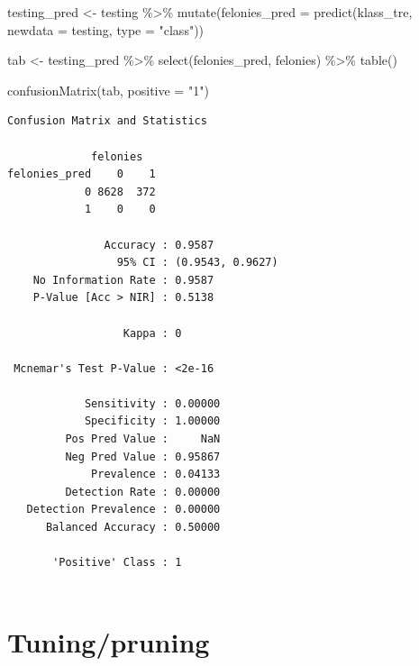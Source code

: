 \documentclass[
  letterpaper,
  DIV=11,
  numbers=noendperiod]{scrreprt}
\newenvironment{Shaded}{\begin{snugshade}}{\end{snugshade}}
\newcommand{\AttributeTok}[1]{\textcolor[rgb]{0.40,0.45,0.13}{#1}}
\newcommand{\FunctionTok}[1]{\textcolor[rgb]{0.28,0.35,0.67}{#1}}
\newcommand{\NormalTok}[1]{\textcolor[rgb]{0.00,0.23,0.31}{#1}}
\newcommand{\OtherTok}[1]{\textcolor[rgb]{0.00,0.23,0.31}{#1}}
\newcommand{\SpecialCharTok}[1]{\textcolor[rgb]{0.37,0.37,0.37}{#1}}
\newcommand{\StringTok}[1]{\textcolor[rgb]{0.13,0.47,0.30}{#1}}
\begin{document}
\begin{Shaded}
\begin{Highlighting}[]
\NormalTok{testing\_pred }\OtherTok{\textless{}{-}}\NormalTok{ testing }\SpecialCharTok{\%\textgreater{}\%}
  \FunctionTok{mutate}\NormalTok{(}\AttributeTok{felonies\_pred =} \FunctionTok{predict}\NormalTok{(klass\_tre, }\AttributeTok{newdata =}\NormalTok{ testing, }\AttributeTok{type =} \StringTok{"class"}\NormalTok{))}

\NormalTok{tab }\OtherTok{\textless{}{-}}\NormalTok{ testing\_pred }\SpecialCharTok{\%\textgreater{}\%}
  \FunctionTok{select}\NormalTok{(felonies\_pred, felonies) }\SpecialCharTok{\%\textgreater{}\%}
  \FunctionTok{table}\NormalTok{()}

\FunctionTok{confusionMatrix}\NormalTok{(tab, }\AttributeTok{positive =} \StringTok{"1"}\NormalTok{)}
\end{Highlighting}
\end{Shaded}

\begin{verbatim}
Confusion Matrix and Statistics

             felonies
felonies_pred    0    1
            0 8628  372
            1    0    0
                                          
               Accuracy : 0.9587          
                 95% CI : (0.9543, 0.9627)
    No Information Rate : 0.9587          
    P-Value [Acc > NIR] : 0.5138          
                                          
                  Kappa : 0               
                                          
 Mcnemar's Test P-Value : <2e-16          
                                          
            Sensitivity : 0.00000         
            Specificity : 1.00000         
         Pos Pred Value :     NaN         
         Neg Pred Value : 0.95867         
             Prevalence : 0.04133         
         Detection Rate : 0.00000         
   Detection Prevalence : 0.00000         
      Balanced Accuracy : 0.50000         
                                          
       'Positive' Class : 1               
                                          
\end{verbatim}

\section{Tuning/pruning}\label{tuningpruning}
\end{document}
